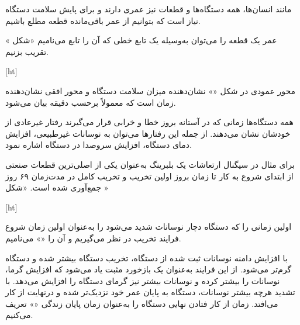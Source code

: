 
\label{basic}


مانند انسان‌ها، همه دستگاه‌ها و قطعات نیز عمری دارند و برای پایش سلامت دستگاه نیاز است که بتوانیم از عمر باقی‌مانده قطعه مطلع باشیم.

عمر یک قطعه را می‌توان به‌وسیله یک تابع خطی که آن را تابع  می‌نامیم «شکل » تقریب بزنیم.



[ht]


محور عمودی در شکل «» نشان‌دهنده میزان سلامت دستگاه و محور افقی نشان‌دهنده زمان است که معمولاً برحسب دقیقه بیان می‌شود.

همه دستگاه‌ها زمانی که در آستانه بروز خطا و خرابی قرار می‌گیرند رفتار غیرعادی از خودشان نشان می‌دهند. از جمله این رفتارها می‌توان به نوسانات غیرطبیعی، افزایش دمای دستگاه، افزایش سروصدا در دستگاه اشاره نمود.


برای مثال در  سیگنال ارتعاشات یک بلبرینگ به‌عنوان یکی از اصلی‌ترین قطعات صنعتی از ابتدای شروع به کار تا زمان بروز اولین تخریب و تخریب کامل در مدت‌زمان ۶۹ روز جمع‌آوری شده است. «شکل »




[ht]





اولین زمانی را که دستگاه دچار نوسانات شدید می‌شود را به‌عنوان اولین زمان شروع فرایند تخریب در نظر می‌گیریم و آن را «» می‌نامیم.


با افزایش دامنه نوسانات ثبت شده از دستگاه، تخریب دستگاه بیشتر شده و دستگاه گرم‌تر می‌شود. از این فرایند به‌عنوان یک بازخورد مثبت یاد می‌شود که افزایش گرما، نوسانات را بیشتر کرده و نوسانات بیشتر نیز گرمای دستگاه را افزایش می‌دهد. با تشدید هرچه بیشتر نوسانات، دستگاه به پایان عمر خود نزدیک‌تر شده و درنهایت از کار می‌افتد. زمان از کار فتادن نهایی دستگاه را به‌عنوان زمان پایان زندگی «» تعریف می‌کنیم.


